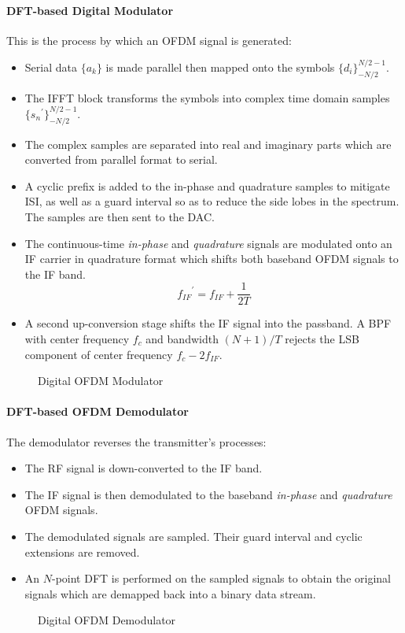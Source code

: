 \paragraph{DFT-based Digital Modulator} This is the process by which an OFDM signal is generated:
\begin{itemize}
	\item Serial data \(\{a_k\}\) is made parallel then mapped onto the symbols \(\{d_i\}_{-N/2}^{N/2-1}\).
	\item The \gls{IFFT} block transforms the symbols into complex time domain samples \(\{{s_n}^\prime\}_{-N/2}^{N/2-1}\).
	\item The complex samples are separated into real and imaginary parts which are converted from parallel format to serial.
	\item A cyclic prefix is added to the in-phase and quadrature samples to mitigate \gls{ISI}, as well as a guard interval so as to reduce the side lobes in the spectrum. The samples are then sent to the \gls{DAC}.
	\item The continuous-time \emph{in-phase} and \emph{quadrature} signals are modulated onto an \gls{IF} carrier in quadrature format which shifts both baseband \gls{OFDM} signals to the \gls{IF} band.
		\[
			{f_{IF}}^\prime = f_{IF} + \frac{1}{2T}
		\]
		\begin{mathDef}
		\end{mathDef}
	\item A second up-conversion stage shifts the \gls{IF} signal into the passband. A \gls{BPF} with center frequency \(f_c\) and bandwidth \((N+1)/T\) rejects the \gls{LSB} component of center frequency \(f_c - 2f_{IF}\).
\end{itemize}
\begin{figure}[!h]
	\centering
	\resizebox{\textwidth}{!}{
		
	}
	\caption{Digital OFDM Modulator}
\end{figure}
\paragraph{DFT-based OFDM Demodulator} The demodulator reverses the transmitter's processes:
\begin{itemize}
	\item The \gls{RF} signal is down-converted to the \gls{IF} band.
	\item The \gls{IF} signal is then demodulated to the baseband \emph{in-phase} and \emph{quadrature} \gls{OFDM} signals.
	\item The demodulated signals are sampled. Their guard interval and cyclic extensions are removed.
	\item An \(N\)-point \gls{DFT} is performed on the sampled signals to obtain the original signals which are demapped back into a binary data stream.
\end{itemize}
\begin{figure}[!ht]
	\centering
	\resizebox{\textwidth}{!}{
		
	}
	\caption{Digital OFDM Demodulator}
\end{figure}

